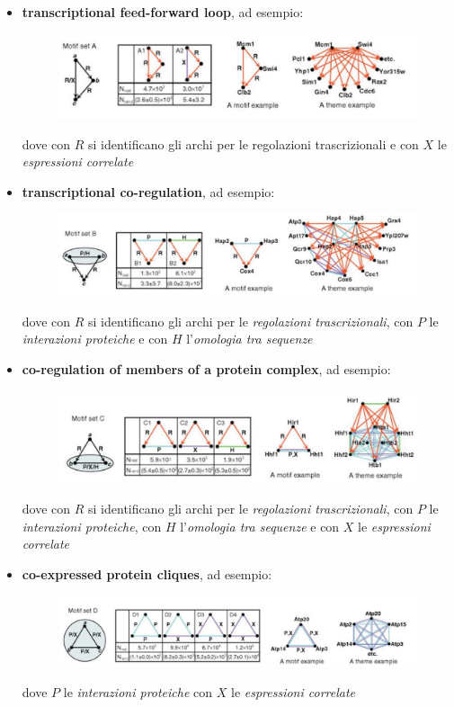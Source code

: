 \documentclass[a4paper,12pt, oneside]{book}
\begin{document}
\begin{itemize}
  \item \textbf{transcriptional feed-forward loop}, ad esempio:
  \begin{figure}[H]
    \centering
    \includegraphics[width = \textwidth]{img/mot1.jpg}
  \end{figure}
  dove con $R$ si identificano gli archi per le regolazioni trascrizionali e con
  $X$ le \textit{espressioni correlate}
  \item \textbf{transcriptional co-regulation}, ad esempio:
  \begin{figure}[H]
    \centering
    \includegraphics[width = \textwidth]{img/mot2.jpg}
  \end{figure}
  dove con $R$ si identificano gli archi per le \textit{regolazioni
    trascrizionali}, con 
  $P$ le \textit{interazioni proteiche} e con $H$ l'\textit{omologia tra
    sequenze} 
  \item \textbf{co-regulation of members of a protein complex}, ad esempio:
  \begin{figure}[H]
    \centering
    \includegraphics[width = \textwidth]{img/mot3.jpg}
  \end{figure}
  dove con $R$ si identificano gli archi per le \textit{regolazioni
    trascrizionali}, con 
  $P$ le \textit{interazioni proteiche}, con $H$ l'\textit{omologia tra
    sequenze} e con
  $X$ le \textit{espressioni correlate}
  \item \textbf{co-expressed protein cliques}, ad esempio:
  \begin{figure}[H]
    \centering
    \includegraphics[width = \textwidth]{img/mot4.jpg}
  \end{figure}
  dove $P$ le \textit{interazioni proteiche} con
  $X$ le \textit{espressioni correlate}
\end{itemize}
\end{document}
